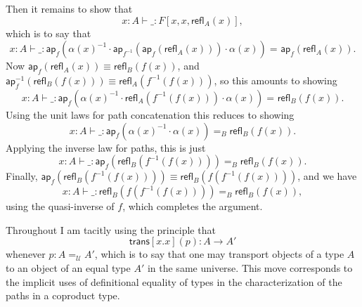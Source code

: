 \documentclass{article}
\newcommand{\idty}[3]{{#2}\mathbin{=_{#1}}{#3}}
\newcommand{\refl}[2]{\mathsf{refl}_{#1}({#2})}
\newcommand{\family}[2]{{#1}.{#2}}
\newcommand{\app}[2]{{#1}({#2})}
\newcommand{\pa}[1]{\mathsf{ap}_{#1}}
\newcommand{\univty}{\mathcal{U}}
\newcommand{\iv}[1]{#1^{-1}}
\newcommand{\concat}[2]{{#1}\cdot{#2}}
\newcommand{\transport}[2]{\mathsf{trans}[#1](#2)}
\begin{document}
Then it remains to show that
\begin{displaymath}
  x{:}A \vdash \_ : F[x,x,\refl{A}{x}],
\end{displaymath}
which is to say that 
\begin{displaymath}
  x{:}A \vdash \_ : \idty{}{\app{\pa{f}}{\concat{\concat{\iv{\app{\alpha}{x}}}{\app{\pa{\iv{f}}}{\app{\pa{f}}{\refl{A}{x}}}}}{\app{\alpha}{x}}}}{\app{\pa{f}}{\refl{A}{x}}}.
\end{displaymath}
Now $\app{\pa{f}}{\refl{A}{x}}\equiv\refl{B}{\app{f}{x}}$, and
$\app{\iv{\pa{f}}}{\refl{B}{\app{f}{x}}} \equiv \refl{A}{\app{\iv{f}}{\app{f}{x}}}$, so this amounts to
showing
\begin{displaymath}
  x{:}A \vdash \_ : \idty{}{\app{\pa{f}}{\concat{\concat{\iv{\app{\alpha}{x}}}{\refl{A}{\app{\iv{f}}{\app{f}{x}}}}}{\app{\alpha}{x}}}}{\refl{B}{\app{f}{x}}}.
\end{displaymath}
Using the unit laws for path concatenation this reduces to showing
\begin{displaymath}
  x{:}A \vdash \_ : \idty{B}{\app{\pa{f}}{\concat{\iv{\app{\alpha}{x}}}{\app{\alpha}{x}}}}{\refl{B}{\app{f}{x}}}.
\end{displaymath}
Applying the inverse law for paths, this is just
\begin{displaymath}
  x:{A} \vdash \_ : \idty{B}{\app{\pa{f}}{\refl{B}{\app{\iv{f}}{\app{f}{x}}}}}{\refl{B}{\app{f}{x}}}.
\end{displaymath}
Finally, $\app{\pa{f}}{\refl{B}{\app{\iv{f}}{\app{f}{x}}}}\equiv \refl{B}{\app{f}{\app{\iv{f}}{\app{f}{x}}}}$, and we have
\begin{displaymath}
  x{:}A \vdash \_ : \idty{B}{\refl{B}{\app{f}{\app{\iv{f}}{\app{f}{x}}}}}{\refl{B}{\app{f}{x}}},
\end{displaymath}
using the quasi-inverse of $f$, which completes the argument.

\smallskip

Throughout I am tacitly using the principle that $$\transport{\family{x}{x}}{p}:A\to A'$$ whenever $p:\idty{\univty}{A}{A'}$, which is to say that one may transport objects of a type $A$ to an object of an equal type $A'$ in the same universe.  This move corresponds to the implicit uses of definitional equality of types in the characterization of the paths in a coproduct type.
\end{document}
